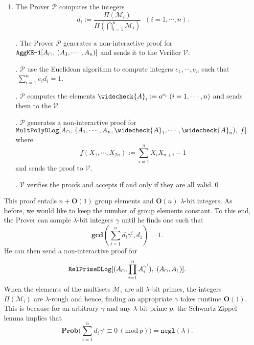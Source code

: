 \documentclass[11pt, lettersize, notitlepage, leqno, footskip=0.6cm]{article}
\newcommand{\pl}{\prod\limits}
\newcommand{\slim}{\sum\limits}
\newcommand{\ttt}{\texttt}
\newcommand{\negl}{\ttt{{negl}}}
\newcommand{\mc}{\mathcal}
\newcommand{\mbf}{\mathbf}
\newcommand{\lam}{\lambda}
\newcommand{\weck}{\widecheck}
\newcommand{\bO}{\mbf{O}}
\newcommand{\mP}{\mc{P}}
\newcommand{\V}{\mc{V}}
\newcommand{\mcM}{\mc{M}}
\newcommand{\vs}{\vspace{-0.15cm}}
\newcommand{\noin}{\noindent}
\newcommand{\Mod}[1]{\ (\mathrm{mod}\ #1)}
\newcommand{\GCD}{\mbf{gcd}}
\numberwithin{equation}{section}
\begin{document}
\begin{enumerate}[wide, labelwidth=!, labelindent=0pt]\vs \item The Prover $\mP$ computes the integers \vs $$d_i:= \frac{\Pi(\mc{M}_i)}{\Pi({\bigcap\limits_{i=1}^n} \mc{M}_i)}\;\; (i=1,\cdots,n).$$

\noin 2. The Prover $\mP$ generates a non-interactive proof for $\ttt{AggKE-1}[A_{\tt{\cap}},\;(A_1,\cdots,A_n)]$ and sends it to the Verifier $\V$.

\noin 3. $\mP$ use the Euclidean algorithm to compute integers $e_1,\cdots,e_n$ such that $\;\slim_{i=1}^n e_id_i = 1$.

\noin 4. $\mP$ computes the elements $\weck{A}_i := a^{e_i}\; (i=1,\cdots,n)$ and sends them to the $\V$.

\noin 5. $\mP$ generates a non-interactive proof for $\ttt{MultPolyDLog}[A_{\tt{\cap}},\; (A_1,\cdots,A_n, \weck{A}_1,\cdots,\weck{A}_n),\;f]$ where \vs $$f(X_1,\cdots,X_{2n}):= \slim_{i=1}^n X_iX_{n+i} - 1 $$ and sends the proof to $\V$.

\noin 6. $\V$ verifies the proofs and accepts if and only if they are all valid.\qed \end{enumerate}

This proof entails $n+\bO(1)$ group elements and $\bO(n)$ $\lam$-bit integers. As before, we would like to keep the number of group elements constant. To this end, the Prover can sample $\lam$-bit integers $\gamma$ until he finds one such that \vs $$\GCD(\slim_{i=1}^n d_i\gamma^i, d_1) = 1 .$$ He can then send a non-interactive proof for \vs $$\ttt{RelPrimeDLog}[(A_{\tt{\cap}},\pl_{i=1}^n A_i^{\gamma^i}),\;(A_{\tt{\cap}}, A_1)].$$ When the elements of the multisets $\mc{M}_i$ are all $\lam$-bit primes, the integers $\Pi(\mcM_i)$ are $\lam$-rough and hence, finding an appropriate $\gamma$ takes runtime $\bO(1)$. This is because for an arbitrary $\gamma$ and any $\lam$-bit prime $p$, the Schwartz-Zippel lemma implies that \vs $$\mbf{Prob}\big(\slim_{i=1}^n d_i\gamma^i \equiv 0\Mod{p} \big) = \negl(\lam). $$ 
\end{document}
